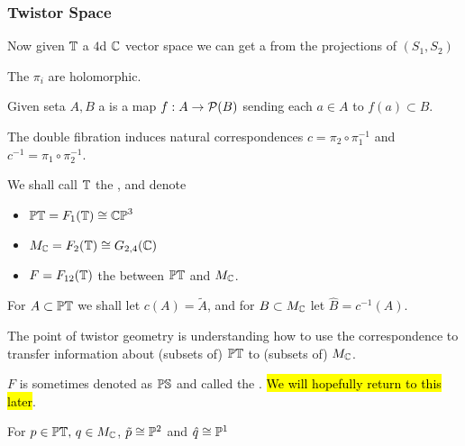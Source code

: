 \documentclass{article}
\begin{document}
\subsubsection{Twistor Space}
Now given $\mathbb{T}$ a $4$d $\mathbb{C}$ vector space we can get a 
from the projections of $(S_1,S_2)$ 
\begin{prop}
	The $\pi_i$ are holomorphic.
\end{prop}

\begin{definition}
	Given seta $A,B$ a   is a map $f: A \to \mathcal{P}(B)$ sending each $a \in A$ to $f(a) \subset B$.
\end{definition}
The double fibration induces natural correspondences $c=\pi_2 \circ \pi_1^{-1}$ and $c^{-1} = \pi_1 \circ \pi_2^{-1}$. 
\begin{notation}
	We shall call $\mathbb{T}$ the , and denote 
	\begin{itemize}
		\item $\mathbb{PT}=F_1(\mathbb{T}) \cong \mathbb{CP}^3$ 
		\item $M_{\mathbb{C}} = F_2(\mathbb{T}) \cong G_{2,4}(\mathbb{C})$ 
		\item $F = F_{12}(\mathbb{T})$ the  between $\mathbb{PT}$ and $M_{\mathbb{C}}$. 
	\end{itemize}
For $A \subset \mathbb{PT}$ we shall let $c(A) = \tilde{A}$, and for $B \subset M_{\mathbb{C}}$ let $\hat{B} = c^{-1}(A)$. 
\end{notation}

\begin{idea}
	The point of twistor geometry is understanding how to use the correspondence
	to transfer information about (subsets of) $\mathbb{PT}$ to (subsets of) $M_{\mathbb{C}}$. 
\end{idea}

\begin{remark}
	$F$ is sometimes denoted as $\mathbb{PS}$ and called the . \hl{We will hopefully return to this later}. 
\end{remark}

\begin{prop}\label{prop:twistor correspondence shape}
	For $p \in \mathbb{PT}, \, q \in M_{\mathbb{C}}$, $\tilde{p} \cong \mathbb{P}^2$ and $\hat{q} \cong \mathbb{P}^1$
\end{prop}
\end{document}
